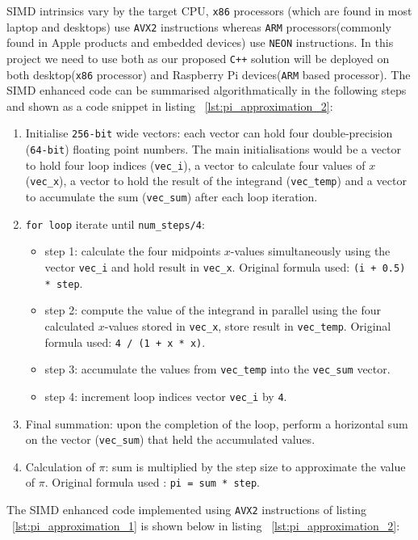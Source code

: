 SIMD intrinsics vary by the target CPU, \texttt{x86} processors (which are found in most laptop and desktops) use \texttt{AVX2} instructions whereas \texttt{ARM} processors(commonly found in Apple products and embedded devices) use \texttt{NEON} instructions. In this project we need to use both as our proposed \texttt{C++} solution will be deployed on both desktop(\texttt{x86} processor) and Raspberry Pi devices(\texttt{ARM} based processor). The SIMD enhanced code can be summarised algorithmatically in the following steps and shown as a code snippet in listing ~\ref{lst:pi_approximation_2}: 

\begin{enumerate}
	\item Initialise \texttt{256-bit} wide vectors: each vector can hold four double-precision (\texttt{64-bit}) floating point numbers. The main initialisations would be a vector to hold four loop indices (\texttt{vec\_i}), a vector to calculate four values of $x$ (\texttt{vec\_x}), a vector to hold the result of the integrand (\texttt{vec\_temp}) and a vector to accumulate the sum (\texttt{vec\_sum}) after each loop iteration.
	\item \texttt{for loop} iterate until \texttt{num\_steps/4}:
	\begin{itemize}
		\item step 1: calculate the four midpoints $x$-values simultaneously using the vector \texttt{vec\_i} and hold result in \texttt{vec\_x}. Original formula used: \texttt{(i + 0.5) * step}.
		\item step 2: compute the value of the integrand in parallel using the four calculated $x$-values stored in \texttt{vec\_x}, store result in \texttt{vec\_temp}. Original formula used: \texttt{4 / (1 + x * x)}.
		\item step 3: accumulate the values from \texttt{vec\_temp} into the \texttt{vec\_sum} vector.
		\item step 4: increment loop indices vector \texttt{vec\_i} by \texttt{4}. 
	\end{itemize}
	\item Final summation: upon the completion of the loop, perform a horizontal sum on the vector (\texttt{vec\_sum}) that held the accumulated values.
	\item Calculation of $\pi$: sum is multiplied by the step size to approximate the value of $\pi$. Original formula used : \texttt{pi = sum * step}.
\end{enumerate}

The SIMD enhanced code implemented using \texttt{AVX2} instructions of listing ~\ref{lst:pi_approximation_1} is shown below in listing ~\ref{lst:pi_approximation_2}: 

